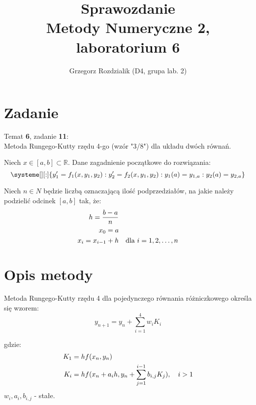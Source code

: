 \documentclass[12pt]{article}
\begin{document}
	\title{Sprawozdanie\\Metody Numeryczne 2, laboratorium 6}
	\author{Grzegorz Rozdzialik (D4, grupa lab. 2)}
	\maketitle	
	
	\section{Zadanie}
	{\Large Temat \textbf{6}, zadanie \textbf{11}:}\\
	Metoda Rungego-Kutty rzędu 4-go (wzór "3/8") dla układu dwóch równań.
	
	Niech $x \in [a, b] \subset \mathbb{R}$. Dane zagadnienie początkowe do rozwiązania:
	\begin{equation}
	\systeme[][:]{
		y_1' = f_1(x, y_1, y_2) :
		y_2' = f_2(x, y_1, y_2) :
		y_1(a) = y_{1, a} :
		y_2(a) = y_{2, a}
	}
	\end{equation}
	
	Niech $n \in N$ będzie liczbą oznaczającą ilość podprzedziałów, na jakie należy podzielić odcinek $[a, b]$ tak, że:
	\begin{align*}
		h = \frac{b - a}{n} & \\
		x_0 = a & \\
		x_i = x_{i - 1} + h & \hspace{10px} \mbox{dla } i = 1, 2, \dots, n
	\end{align*}
	
	
	
	
	\section{Opis metody}
	Metoda Rungego-Kutty rzędu 4 dla pojedynczego równania różniczkowego określa się wzorem:
	\begin{equation}
		y_{n+1} = y_n + \sum_{i = 1}^{4} w_i K_i
		\label{RK4}
	\end{equation}
	
	gdzie:
	\begin{align*}
		K_1 &= hf(x_n, y_n) \\
		K_i &= hf(x_n + a_i h, y_n + \sum_{j = 1}^{i - 1} b_{i, j} K_j), \hspace{10px} i > 1
	\end{align*}
	$w_i, a_i, b_{i, j}$ - stałe.
	
\end{document}
